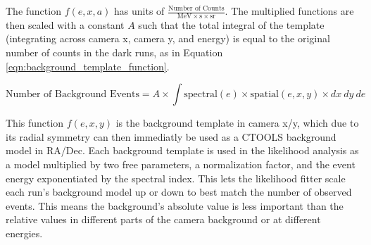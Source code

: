    The function $f(e,x,a)$ has units of $\frac{\textrm{Number of Counts}}{ \textrm{MeV} \times \textrm{s} \times \textrm{sr} }$.
    The multiplied functions are then scaled with a constant $A$ such that the total integral of the template (integrating across camera x, camera y, and energy) is equal to the original number of counts in the dark runs, as in Equation \ref{eqn:background_template_function}.
    
    \begin{equation}\label{eqn:background_template_function}
      \textrm{Number of Background Events} = A \times \int \textrm{spectral}(e) \times \textrm{spatial}(e,x,y) \times dx \: dy \: de
    \end{equation}

    This function $f(e,x,y)$ is the background template in camera x/y, which due to its radial symmetry can then immediatly be used as a CTOOLS background model in RA/Dec.
    Each background template is used in the likelihood analysis as a model multiplied by two free parameters, a normalization factor, and the event energy exponentiated by the spectral index.
    This lets the likelihood fitter scale each run's background model up or down to best match the number of observed events.
    This means the background's absolute value is less important than the relative values in different parts of the camera background or at different energies.
  
  \FloatBarrier

